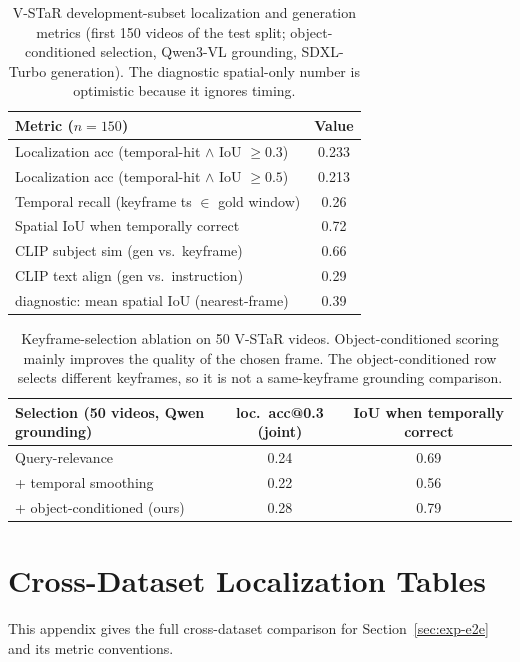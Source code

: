\begin{table}[htbp]
\centering
\small
\begin{tabular}{lc}
\toprule
Metric ($n=150$) & Value \\
\midrule
Localization acc (temporal-hit $\wedge$ IoU $\ge 0.3$) & 0.233 \\
Localization acc (temporal-hit $\wedge$ IoU $\ge 0.5$) & 0.213 \\
Temporal recall (keyframe ts $\in$ gold window) & 0.26 \\
Spatial IoU when temporally correct & 0.72 \\
CLIP subject sim (gen vs.\ keyframe) & 0.66 \\
CLIP text align (gen vs.\ instruction) & 0.29 \\
diagnostic: mean spatial IoU (nearest-frame) & 0.39 \\
\bottomrule
\end{tabular}
\caption{V-STaR development-subset localization and generation metrics (first 150 videos of the test split; object-conditioned selection, Qwen3-VL grounding, SDXL-Turbo generation). The diagnostic spatial-only number is optimistic because it ignores timing.}
\label{tab:vstar-dev}
\end{table}

\begin{table}[htbp]
\centering
\small
\begin{tabular}{lcc}
\toprule
Selection (50 videos, Qwen grounding) & loc.\ acc@0.3 (joint) & IoU when temporally correct \\
\midrule
Query-relevance & 0.24 & 0.69 \\
+ temporal smoothing & 0.22 & 0.56 \\
+ object-conditioned (ours) & 0.28 & 0.79 \\
\bottomrule
\end{tabular}
\caption{Keyframe-selection ablation on 50 V-STaR videos. Object-conditioned scoring mainly improves the quality of the chosen frame. The object-conditioned row selects different keyframes, so it is not a same-keyframe grounding comparison.}
\label{tab:sel50}
\end{table}

\section{Cross-Dataset Localization Tables}\label{app:cross}

This appendix gives the full cross-dataset comparison for Section~\ref{sec:exp-e2e} and its metric conventions.

